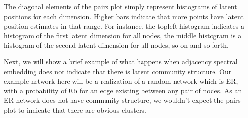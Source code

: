 \documentclass[letterpaper,10pt,english]{jupyterBook}
\begin{document}
\sphinxAtStartPar
The diagonal elements of the pairs plot simply represent histograms of latent positions for each dimension. Higher bars indicate that more points have latent position estimates in that range. For instance, the top\sphinxhyphen{}left histogram indicates a histogram of the first latent dimension for all nodes, the middle histogram is a histogram of the second latent dimension for all nodes, so on and so forth.

\sphinxAtStartPar
Next, we will show a brief example of what happens when adjacency spectral embedding does not indicate that there is latent community structure. Our example network here will be a realization of a random network which is ER, with a probability of \(0.5\) for an edge existing between any pair of nodes. As an ER network does not have community structure, we wouldn’t expect the pairs plot to indicate that there are obvious clusters.

\begin{sphinxVerbatim}[commandchars=\\\{\}]
   

     
 
\end{sphinxVerbatim}

\noindent{}

\begin{sphinxVerbatim}[commandchars=\\\{\}]
    
  

   
\end{sphinxVerbatim}
\end{document}
